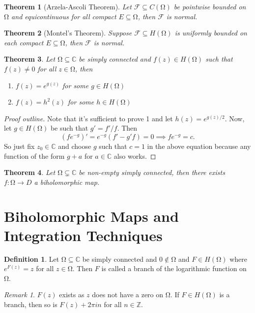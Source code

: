\documentclass[letterpaper,12pt]{article}
\theoremstyle{definition}
\newtheorem{definition}{Definition}[section]
\theoremstyle{plain}
\newtheorem{thm}{Theorem}[section]
\theoremstyle{remark}
\newtheorem*{remark}{Remark}
\newcommand{\C}{\mathbb{C}}
\let\oldOmega\Omega
\renewcommand{\Omega}{\mathrm{\oldOmega}}
\begin{document}
\begin{thm}[Arzela-Ascoli Theorem]
Let $\mathcal{F}\subseteq C(\Omega)$ be pointwise bounded on $\Omega$ and equicontinuous for all compact $E\subseteq \Omega$, then $\mathcal{F}$ is normal.
\end{thm}

\begin{thm}[Montel's Theorem]
Suppose $\mathcal{F}\subseteq H(\Omega)$ is uniformly bounded on each compact $E\subseteq \Omega$, then $\mathcal{F}$ is normal.
\end{thm}

\begin{thm}
Let $\Omega\subseteq \C$ be simply connected and $f(z)\in H(\Omega)$ such that $f(z)\ne 0$ for all $z\in\Omega$, then
\begin{enumerate}
  \item $f(z) = e^{g(z)}$ for some $g\in H(\Omega)$
  \item $f(z) = h^2(z)$ for some $h\in H(\Omega)$
\end{enumerate}
\end{thm}

\begin{proof}[Proof outline]
Note that it's sufficient to prove 1 and let $h(z) = e^{g(z)/2}$. Now, let $g\in H(\Omega)$ be such that $g' = f'/f$. Then
\[(fe^{-g})' = e^{-g}(f'-g'f) = 0\implies fe^{-g} = c.\]
So just fix $z_0\in \C$ and choose $g$ such that $c = 1$ in the above equation because any function of the form $g+a$ for $a\in\C$ also works.
\end{proof}

\begin{thm}
Let $\Omega \subsetneq\C$ be non-empty simply connected, then there exists $f:\Omega\to D$ a biholomorphic map.
\end{thm}

\section{Biholomorphic Maps and Integration Techniques}

\begin{definition}
Let $\Omega \subseteq \C$ be simply connected and $0\notin\Omega$ and $F\in H(\Omega)$ where $e^{F(z)} = z$ for all $z\in\Omega$. Then $F$ is called a branch of the logarithmic function on $\Omega$.
\end{definition}

\begin{remark}
$F(z)$ exists as $z$ does not have a zero on $\Omega$. If $F\in H(\Omega)$ is a branch, then so is $F(z) + 2\pi in$ for all $n\in\mathbb{Z}$.
\end{remark}
\end{document}

